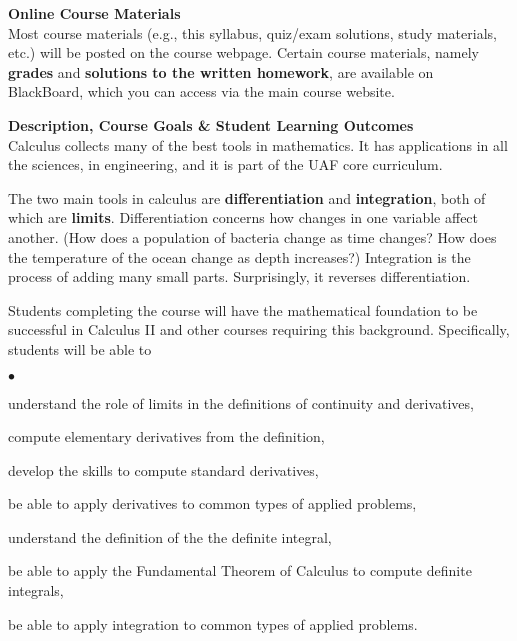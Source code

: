\documentclass[12pt]{article}
\renewcommand{\emph}[1]{\textsf{\textbf{#1}}}
\newcommand{\localhead}[1]{\par\smallskip\textbf{#1}\nobreak\\}%
\def\heading#1{\localhead{\large\emph{#1}}}
\newenvironment{clist}%
{\bgroup\parskip 0pt\begin{list}{$\bullet$}{\partopsep 4pt\topsep 0pt\itemsep -2pt}}%
{\end{list}\egroup}%
\begin{document}
\heading{Online Course Materials}
Most course materials (e.g., this syllabus, quiz/exam solutions, study materials, etc.) will be posted on the course webpage.  Certain course materials, namely \emph{grades} and \emph{solutions to the written homework}, are available on BlackBoard, which you can access via the main course website.

\heading{Description, Course Goals \& Student Learning Outcomes}
Calculus collects many of the best tools in mathematics.  It has applications in all the sciences, in engineering, and it is part of the UAF core curriculum.

The two main tools in calculus are \emph{differentiation} and \emph{integration}, both of which are \emph{limits}.  Differentiation concerns how changes in one variable affect another.  (How does a population of bacteria change as time changes?  How does the temperature of the ocean change as depth increases?)  Integration is the process of adding many small parts.  Surprisingly, it reverses differentiation.

Students completing the course will have the mathematical foundation to be successful in Calculus II and other courses
requiring this background.  Specifically, students will be able to

\begin{clist}
\item understand the role of limits in the definitions of continuity and derivatives,
\item compute elementary derivatives from the definition,
\item develop the skills to compute standard derivatives,
\item be able to apply derivatives to common types of applied problems,
\item understand the definition of the the definite integral,
\item be able to apply the Fundamental Theorem of Calculus to
compute definite integrals,
\item be able to apply integration to common types of applied problems.
\end{clist}

%
\end{document}
